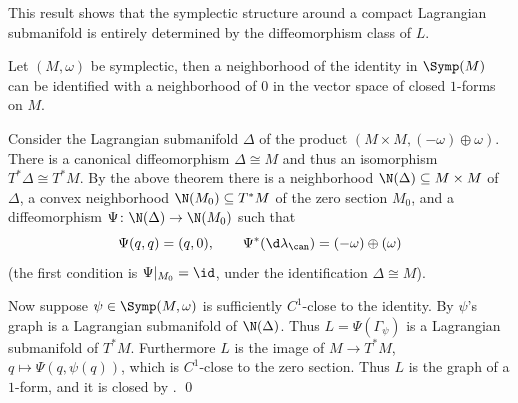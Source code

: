 \eproof

\bnote

    This result shows that the symplectic structure around a compact Lagrangian submanifold is entirely determined by the diffeomorphism class of $L$.

\enote


\bprop

    Let $(M,\omega)$ be symplectic, then a neighborhood of the identity in $\Symp(M)$ can be identified with a neighborhood of $0$ in the vector space of closed
    $1$-forms on $M$.

\eprop

\bproof

    Consider the Lagrangian submanifold $\Delta$ of the product $(M\times M,(-\omega)\oplus\omega)$.
    There is a canonical diffeomorphism $\Delta\cong M$ and thus an isomorphism $T^*\Delta\cong T^*M$.
    By the above theorem there is a neighborhood $\N(\Delta)\subseteq M\times M$ of $\Delta$, a convex neighborhood $\N(M_0)\subseteq T^*M$ of the zero section
    $M_0$, and a diffeomorphism $\Psi\colon\N(\Delta)\to\N(M_0)$ such that
    $$ \Psi(q,q) = (q,0),\qquad \Psi^*(\d\lambda_\can) = (-\omega)\oplus(\omega) $$
    (the first condition is $\Psi|_{M_0}=\id$, under the identification $\Delta\cong M$).

    Now suppose $\psi\in\Symp(M,\omega)$ is sufficiently $C^1$-close to the identity.
    By  $\psi$'s graph is a Lagrangian submanifold of $\N(\Delta)$.
    Thus $L=\Psi(\Gamma_\psi)$ is a Lagrangian submanifold of $T^*M$.
    Furthermore $L$ is the image of $M\to T^*M$, $q\mapsto\Psi(q,\psi(q))$, which is $C^1$-close to the zero section.
    Thus $L$ is the graph of a $1$-form, and it is closed by .
    \qed

\eproof

